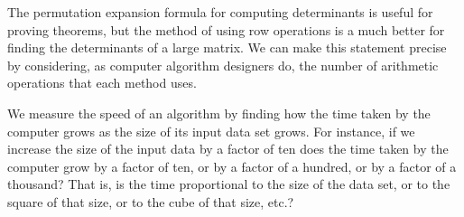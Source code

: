 The permutation expansion formula for computing determinants is useful 
for proving theorems, but the method of using row operations
is a much better for finding the determinants of a large matrix.
We can make this statement 
precise by considering, as computer algorithm designers do,
the number of arithmetic operations that each method uses.

We measure the speed of an algorithm by finding
how the time taken by the computer grows as the size of
its input data set grows. 
For instance, if
we increase the size of the input data by a
factor of ten
does the time taken by the computer grow by a factor of ten,
or by a factor of a hundred, or by a factor of a thousand?
That is, 
is the time proportional to the size of the data set, 
or to the square of that size, or to the cube of that size, etc.? 

